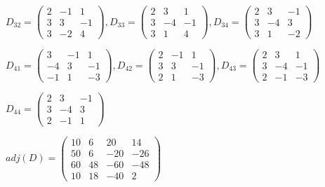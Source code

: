 \documentclass[fleqn]{article}
\begin{document}
\begin{enumerate}
    $D_{32}=
      \begin{pmatrix}
       2 & -1 & 1 \\
       3 & 3 & -1 \\
       3 & -2 & 4 
      \end{pmatrix},
      D_{33}=
      \begin{pmatrix}
       2 & 3 & 1 \\
       3 & -4 & -1 \\
       3 & 1 & 4 
      \end{pmatrix},
      D_{34}=\begin{pmatrix}
       2 & 3 & -1 \\
       3 & -4 & 3 \\
       3 & 1 & -2 
      \end{pmatrix}
    $


    $D_{41}=
      \begin{pmatrix}
       3 & -1 & 1 \\
       -4 & 3 & -1 \\
       -1 & 1 & -3 
      \end{pmatrix},
      D_{42}=
      \begin{pmatrix}
       2 & -1 & 1 \\
       3 & 3 & -1 \\
       2 & 1 & -3 
      \end{pmatrix},
      D_{43}=\begin{pmatrix}
       2 & 3 & 1 \\
       3 & -4 & -1 \\
       2 & -1 & -3
      \end{pmatrix}
    $

    $D_{44}=
      \begin{pmatrix}
       2 & 3 & -1 \\
       3 & -4 & 3 \\
       2 & -1 & 1 
      \end{pmatrix}
    $


    $adj(D)=
      \begin{pmatrix}
       10 & 6 & 20 & 14 \\ 
       50 & 6 & -20 & -26 \\ 
       60 & 48 & -60 & -48 \\ 
       10 & 18 & -40 & 2
      \end{pmatrix}
    $



\end{enumerate}
\end{document}

